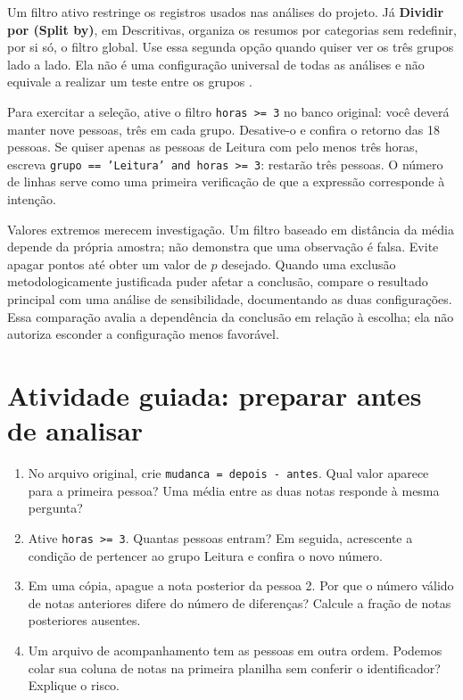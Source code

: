 Um filtro ativo restringe os registros usados nas análises do projeto. Já \textbf{Dividir por (Split by)}, em Descritivas, organiza os resumos por categorias sem redefinir, por si só, o filtro global. Use essa segunda opção quando quiser ver os três grupos lado a lado. Ela não é uma configuração universal de todas as análises e não equivale a realizar um teste entre os grupos \parencite{JamoviDescritivas}.

Para exercitar a seleção, ative o filtro \texttt{horas >= 3} no banco original: você deverá manter nove pessoas, três em cada grupo. Desative-o e confira o retorno das 18 pessoas. Se quiser apenas as pessoas de Leitura com pelo menos três horas, escreva \texttt{grupo == 'Leitura' and horas >= 3}: restarão três pessoas. O número de linhas serve como uma primeira verificação de que a expressão corresponde à intenção.

Valores extremos merecem investigação. Um filtro baseado em distância da média depende da própria amostra; não demonstra que uma observação é falsa. Evite apagar pontos até obter um valor de $p$ desejado. Quando uma exclusão metodologicamente justificada puder afetar a conclusão, compare o resultado principal com uma análise de sensibilidade, documentando as duas configurações. Essa comparação avalia a dependência da conclusão em relação à escolha; ela não autoriza esconder a configuração menos favorável.

\section{Atividade guiada: preparar antes de analisar}

\begin{enumerate}
  \item No arquivo original, crie \texttt{mudanca = depois - antes}. Qual valor aparece para a primeira pessoa? Uma média entre as duas notas responde à mesma pergunta?
  \item Ative \texttt{horas >= 3}. Quantas pessoas entram? Em seguida, acrescente a condição de pertencer ao grupo Leitura e confira o novo número.
  \item Em uma cópia, apague a nota posterior da pessoa 2. Por que o número válido de notas anteriores difere do número de diferenças? Calcule a fração de notas posteriores ausentes.
  \item Um arquivo de acompanhamento tem as pessoas em outra ordem. Podemos colar sua coluna de notas na primeira planilha sem conferir o identificador? Explique o risco.
\end{enumerate}

